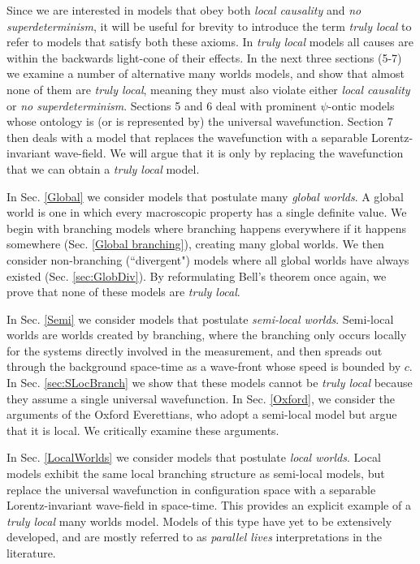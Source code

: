 \documentclass[a4paper]{article}
\begin{document}
Since we are interested in models that obey both \textit{local causality} and \textit{no superdeterminism}, it will be useful for brevity to introduce the term \textit{truly local} to refer to models that satisfy both these axioms. In \textit{truly local} models all causes are within the backwards light-cone of their effects. In the next three sections (5-7) we examine a number of alternative many worlds models, and show that almost none of them are \textit{truly local}, meaning they must also violate either \textit{local causality} or \textit{no superdeterminism}. Sections 5 and 6 deal with prominent $\psi$-ontic models whose ontology is (or is represented by) the universal wavefunction. Section 7 then deals with a model that replaces the wavefunction with a separable Lorentz-invariant wave-field. We will argue that it is only by replacing the wavefunction that we can obtain a \textit{truly local} model.

In Sec. \ref{Global} we consider models that postulate many \textit{global worlds}. A global world is one in which every macroscopic property has a single definite value. We begin with branching models where branching happens everywhere if it happens somewhere (Sec. \ref{Global branching}), creating many global worlds. We then consider non-branching (``divergent") models where all global worlds have always existed (Sec. \ref{sec:GlobDiv}). By reformulating Bell's theorem once again, we prove that none of these models are \textit{truly local}.

In Sec. \ref{Semi} we consider models that postulate \textit{semi-local worlds}. Semi-local worlds are worlds created by branching, where the branching only occurs locally for the systems directly involved in the measurement, and then spreads out through the background space-time as a wave-front whose speed is bounded by $c$. In Sec. \ref{sec:SLocBranch} we show that these models cannot be \textit{truly local} because they assume a single universal wavefunction. In Sec. \ref{Oxford}, we consider the arguments of the Oxford Everettians, who adopt a semi-local model but argue that it is local. We critically examine these arguments.    


In Sec. \ref{LocalWorlds} we consider models that postulate \textit{local worlds}. Local models exhibit the same local branching structure as semi-local models, but replace the universal wavefunction in configuration space with a separable Lorentz-invariant wave-field in space-time. This provides an explicit example of a \textit{truly local} many worlds model.  Models of this type have yet to be extensively developed, and are mostly referred to as \textit{parallel lives} interpretations in the literature.
\end{document}
